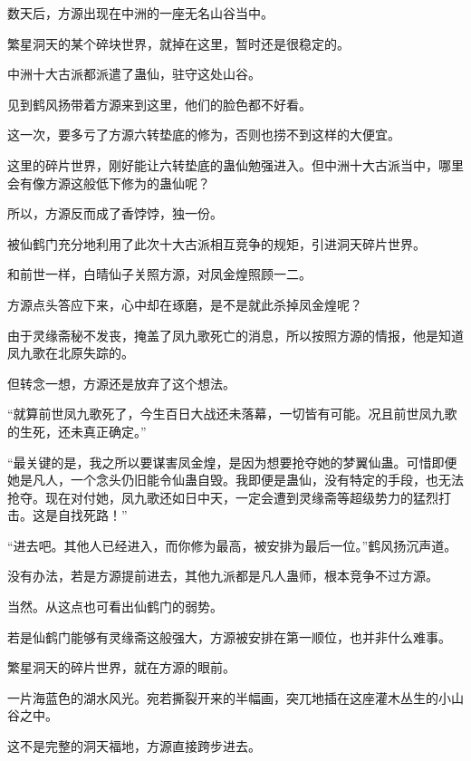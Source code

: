 
\begin{this_body}



数天后，方源出现在中洲的一座无名山谷当中。

繁星洞天的某个碎块世界，就掉在这里，暂时还是很稳定的。

中洲十大古派都派遣了蛊仙，驻守这处山谷。

见到鹤风扬带着方源来到这里，他们的脸色都不好看。

这一次，要多亏了方源六转垫底的修为，否则也捞不到这样的大便宜。

这里的碎片世界，刚好能让六转垫底的蛊仙勉强进入。但中洲十大古派当中，哪里会有像方源这般低下修为的蛊仙呢？

所以，方源反而成了香饽饽，独一份。

被仙鹤门充分地利用了此次十大古派相互竞争的规矩，引进洞天碎片世界。

和前世一样，白晴仙子关照方源，对凤金煌照顾一二。

方源点头答应下来，心中却在琢磨，是不是就此杀掉凤金煌呢？

由于灵缘斋秘不发丧，掩盖了凤九歌死亡的消息，所以按照方源的情报，他是知道凤九歌在北原失踪的。

但转念一想，方源还是放弃了这个想法。

“就算前世凤九歌死了，今生百日大战还未落幕，一切皆有可能。况且前世凤九歌的生死，还未真正确定。”

“最关键的是，我之所以要谋害凤金煌，是因为想要抢夺她的梦翼仙蛊。可惜即便她是凡人，一个念头仍旧能令仙蛊自毁。我即便是蛊仙，没有特定的手段，也无法抢夺。现在对付她，凤九歌还如日中天，一定会遭到灵缘斋等超级势力的猛烈打击。这是自找死路！”

“进去吧。其他人已经进入，而你修为最高，被安排为最后一位。”鹤风扬沉声道。

没有办法，若是方源提前进去，其他九派都是凡人蛊师，根本竞争不过方源。

当然。从这点也可看出仙鹤门的弱势。

若是仙鹤门能够有灵缘斋这般强大，方源被安排在第一顺位，也并非什么难事。

繁星洞天的碎片世界，就在方源的眼前。

一片海蓝色的湖水风光。宛若撕裂开来的半幅画，突兀地插在这座灌木丛生的小山谷之中。

这不是完整的洞天福地，方源直接跨步进去。


\end{this_body}
